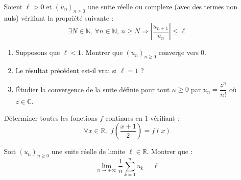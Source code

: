 \documentclass[a4paper,10pt]{report}
\begin{document}
\begin{Exa} Soient $\ell>0$ et $(u_n)_{n \geq 0}$ une suite réelle ou complexe (avec des termes non nuls) vérifiant la propriété suivante :
$$\exists N \in \mathbb{N}, \, \forall n \in \mathbb{N}, \, n \geq N \Longrightarrow \left\vert \frac{u_{n+1}}{u_n} \right\vert   \leq \ell$$

\begin{enumerate}
\item Supposons que $\ell<1$. Montrer que $(u_n)_{n \geq 0}$ converge vers $0$.
\item Le résultat précédent est-il vrai si $\ell = 1$ ?
\item Étudier la convergence de la suite définie pour tout $n \geq 0$ par $u_n = \dfrac{z^n}{n!}$ où $z \in \mathbb{C}$.
\end{enumerate}
\end{Exa}

\begin{Exa}[\ding{80}] Déterminer toutes les fonctions $f$ continues en $1$ vérifiant :
$$ \forall x \in \mathbb{R}, \, \, f \left( \frac{x+1}{2} \right) =f(x)$$
\end{Exa}


\begin{Exa} Soit $(u_n)_{n \geq 0}$ une suite réelle de limite $\ell \in \mathbb{R}$. Montrer que :
$$ \lim_{n \rightarrow + \infty} \frac{1}{n} \sum_{k=1}^n u_k = \ell$$
\end{Exa}
\end{document}
